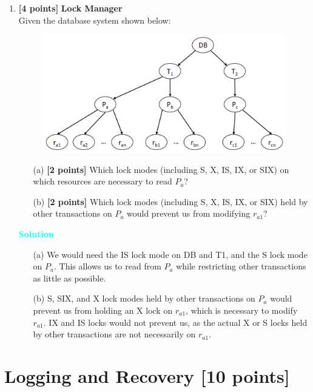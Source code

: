 \documentclass[10pt]{article}
\newenvironment{solution}
    { \begin{mdframed}[backgroundcolor=gray!10] \textcolor{cyan}{\textbf{Solution}} \\}
    {  \end{mdframed}}
\begin{document}
\begin{enumerate}
	\item \textbf{[4 points]} \textbf{Lock Manager} \\
	      Given the database system shown below:
	      \begin{figure}[ht]
		      \centering
		      \includegraphics[width=0.7\linewidth]{lock_mode}
	      \end{figure}
	      \begin{itemize}
		      \item[(a)] \textbf{[2 points]} Which lock modes (including S, X, IS, IX, or SIX) on which resources are necessary to read $P_a$?
		      \item[(b)] \textbf{[2 points]} Which lock modes (including S, X, IS, IX, or SIX) held by other transactions on $P_a$ would prevent us from modifying $r_{a1}$?
	      \end{itemize}
	      \begin{solution}
		      \begin{itemize}
			      \item[(a)] We would need the IS lock mode on DB and T1, and the S lock mode on $P_a$. This allows us
			            to read from $P_a$ while restricting other transactions as little as possible.
			      \item[(b)] S, SIX, and X lock modes held by other transactions on $P_a$ would prevent us from holding
			            an X lock on $r_{a1}$, which is necessary to modify $r_{a1}$. IX and IS locks would not prevent us, as
			            the actual X or S locks held by other transactions are not necessarily on $r_{a1}$.
		      \end{itemize}
	      \end{solution}
\end{enumerate}



\newpage
\section{Logging and Recovery \textbf{[10 points]}}
\end{document}
